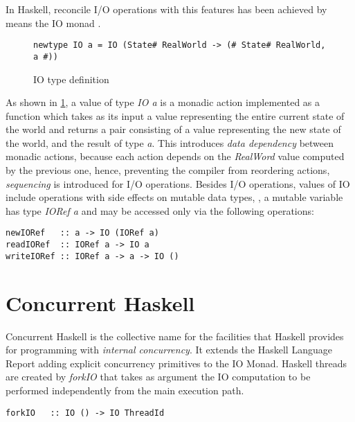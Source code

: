 In Haskell, reconcile I/O operations with this features has been achieved by means the IO monad \cite{PeytonJones:1993:IFP:158511.158524}.
\begin{figure}
\begin{lstlisting}
newtype IO a = IO (State# RealWorld -> (# State# RealWorld, a #))
\end{lstlisting}
\caption{IO type definition}
\label{fig:io}
\end{figure}
As shown in \cref{fig:io}, a value of type \emph{IO a} is a monadic action implemented as a function which takes as its input a value representing the entire current state of the world and returns a pair consisting of a value representing the new state of the world, and the result of type \emph{a}.
This introduces \emph{data dependency} between monadic actions, because each action depends on the \emph{RealWord} value computed by the previous one, hence, preventing the compiler from reordering actions, \emph{sequencing} is introduced for I/O operations.
Besides I/O operations, values of IO include operations with side effects on mutable data types, \eg, a mutable variable has type \emph{IORef a} and may be accessed only via the following operations:

\begin{lstlisting}
newIORef   :: a -> IO (IORef a)
readIORef  :: IORef a -> IO a
writeIORef :: IORef a -> a -> IO ()
\end{lstlisting}

\section{Concurrent Haskell}
Concurrent Haskell is the collective name for the facilities that Haskell provides for programming with \emph{internal concurrency}.
It extends the Haskell Language Report adding explicit concurrency primitives to the IO Monad.
Haskell threads are created by \emph{forkIO} that takes as argument the IO computation to be performed independently from the main execution path.
\begin{lstlisting}
forkIO   :: IO () -> IO ThreadId
\end{lstlisting}

